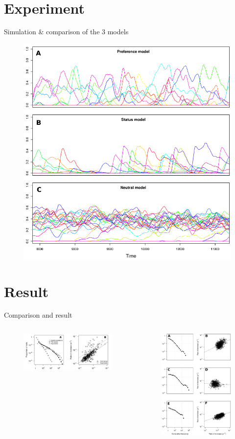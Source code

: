 \documentclass{beamer}
\begin{document}
\section{Experiment}
\begin{frame}{Simulation \& comparison of the 3 models }

	\begin{figure}
		\includegraphics[width=.60\textwidth]{3model.png}
	\end{figure}
	
\end{frame}
\section{Result}
\begin{frame}{Comparison and result}

	\begin{columns}
		\begin{column}{.4\textwidth}
			\begin{figure}
				\includegraphics[width=5cm]{realdata.png}
			\end{figure}
		\end{column}
		\begin{column}{.6\textwidth}
			\begin{figure}
				\includegraphics[width=4cm]{3modelcomp.png}
			\end{figure}
		\end{column}
	\end{columns}
	
\end{frame}
\end{document}
